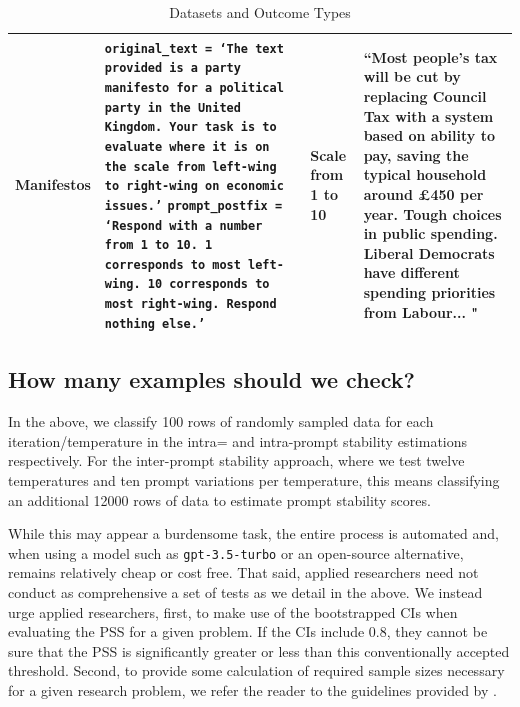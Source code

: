 \begin{table}
\begin{tabular}{| m{2cm} | m{8cm} | m{3cm} | m{6cm} |}
        Manifestos & 
        \texttt{original\_text = `The text provided is a party manifesto for a political party in the United Kingdom. Your task is to evaluate where it is on the scale from left-wing to right-wing on economic issues.'}
        \texttt{prompt\_postfix = `Respond with a number from 1 to 10. 1 corresponds to most left-wing. 10 corresponds to most right-wing. Respond nothing else.'}
        & Scale from 1 to 10 &
        ``Most people's tax will be cut by replacing Council Tax with a system based on ability to pay, saving the typical household around £450 per year. Tough choices in public spending. Liberal Democrats have different spending priorities from Labour... "\\ \hline
    \end{tabular}
    \caption{Datasets and Outcome Types}
    \label{tab:datasets}
\end{table}

\subsection{How many examples should we check?}

In the above, we classify 100 rows of randomly sampled data for each iteration/temperature in the intra= and intra-prompt stability estimations respectively. For the inter-prompt stability approach, where we test twelve temperatures and ten prompt variations per temperature, this means classifying an additional 12000 rows of data to estimate prompt stability scores.

While this may appear a burdensome task, the entire process is automated and, when using a model such as \texttt{gpt-3.5-turbo} or an open-source alternative, remains relatively cheap or cost free. That said, applied researchers need not conduct as comprehensive a set of tests as we detail in the above. We instead urge applied researchers, first, to make use of the bootstrapped CIs when evaluating the PSS for a given problem. If the CIs include 0.8, they cannot be sure that the PSS is significantly greater or less than this conventionally accepted threshold. Second, to provide some calculation of required sample sizes necessary for a given research problem, we refer the reader to the guidelines provided by \cite{krippendorff2011agreement}.

